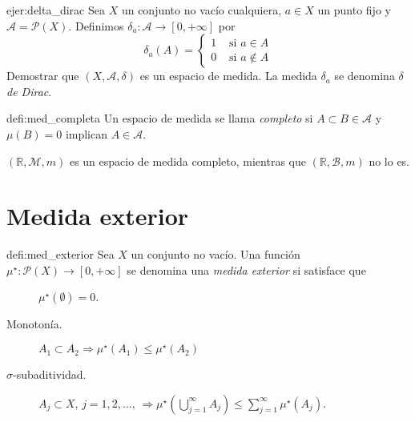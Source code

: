 \begin{ejercicio}{ejer:delta_dirac}
 Sea $X$ un conjunto no vacío cualquiera, $a\in X$ un punto fijo y $\mathscr{A}=\mathcal{P}(X)$. Definimos $\delta_a:\mathscr{A}\to [0,+\infty]$ por
 \[
  \delta_a(A)=\left\{\begin{array}{ll} 1 &\text{ si } a\in A\\0 &\text{ si } a\notin A\end{array}\right.
 \]
 Demostrar que $(X,\mathscr{A},\delta)$ es un espacio de medida. La medida $\delta_a$
se denomina \emph{$\delta$ de Dirac}. 
\end{ejercicio}
\begin{definicion}{defi:med_completa}
 Un espacio de medida  se llama \emph{completo} si $A\subset B\in\mathscr{A}$ y $\mu(B)=0$ implican $A\in\mathscr{A}$.
\end{definicion}

\begin{ejemplo}{}  $(\mathbb{R},\mathscr{M},m)$ es un espacio de medida completo, mientras que $(\mathbb{R},\mathscr{B},m)$ no lo es.
\end{ejemplo}





\section{Medida exterior}

\begin{definicion}{defi:med_exterior}
Sea $X$ un conjunto no vacío. Una función $\mu^\star:\mathcal{P}(X)\to [0,+\infty]$ se denomina una \emph{medida exterior} si satisface que  	
  \begin{description}
   \item[] $\mu^\star(\emptyset)=0$. 
   \item[Monotonía.] $A_1\subset A_2\Rightarrow \mu^\star(A_1)\leq \mu^\star(A_2)$ 
   \item[$\sigma$-subaditividad.] $A_j\subset X$, $j=1,2,\ldots$, $\Rightarrow  \mu^\star\left(\bigcup\limits_{j=1}^{\infty}A_j\right)\leq\sum_{j=1}^{\infty}\mu^\star(A_j)$.
   \end{description}


\end{definicion}

